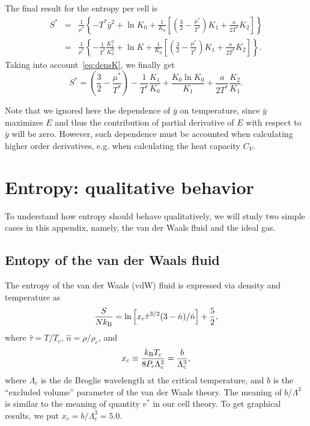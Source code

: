 \documentclass[12pt]{article}
\numberwithin{equation}{section}
\begin{document}
	The final result for the entropy per cell is
	\begin{eqnarray}
		S^{*} & = & \frac{1}{\rho^*} \left\{ -T^* \bar{y}^2 + \ln K_0 + \frac{1}{K_0} \left[\left(\frac{3}{2} - \frac{\mu^*}{T^*} \right)K_1 + \frac{a}{2 T^*} K_2\right] \right\}
		\\
		& = & \frac{1}{\rho^*} \left\{ -\frac{1}{T^*} \frac{K_1^2}{K_0^2} + \ln K + \frac{1}{K_0} \left[\left(\frac{3}{2} - \frac{\mu^*}{T^*} \right)K_1 + \frac{a}{2 T^*} K_2\right] \right\}.
	\end{eqnarray}
	Taking into account~\eqref{eq:densK}, we finally get
	\begin{equation}
		S^* = \left(\frac{3}{2} - \frac{\mu^*}{T^*}\right) - \frac{1}{T^*}\frac{K_1}{K_0} + \frac{K_0 \ln K_0}{K_1} + \frac{a}{2T^*} \frac{K_2}{K_1}.
	\end{equation}
	
	Note that we ignored here the dependence of $\bar{y}$ on temperature, since $\bar{y}$ maximizes $E$ and thus the contribution of partial derivative of $E$ with respect to $\bar{y}$ will be zero. However, such dependence must be accounted when calculating higher order derivatives, e.g. when calculating the heat capacity $C_V$.
	
	\section{Entropy: qualitative behavior}
	To understand how entropy should behave qualitatively, we will study two simple cases in this appendix, namely, the van der Waals fluid and the ideal gas.
	
	\subsection{Entopy of the van der Waals fluid}
	The entropy of the van der Waals (vdW) fluid is expressed via density and temperature as~\cite[(55)]{Johnston14}
	\begin{equation}
		\label{vdw:S}
		\frac{S}{N k_{\rm B}} = \ln \left[x_c\hat{\tau}^{3/2}(3-\hat{n})/\hat{n}\right] + \frac{5}{2},
	\end{equation}
	where $\hat{\tau} = T/T_c$, $\hat{n} = \rho/\rho_c$, and 
	\begin{equation}
		x_c \equiv \frac{k_{\rm B} T_c}{8P_c \Lambda^3_c} = \frac{b}{\Lambda^3_c},
	\end{equation}
	where $\Lambda_c$ is the de Broglie wavelength at the critical temperature, and $b$ is the ``excluded volume'' parameter of the van der Waals theory. The meaning of $b/\Lambda^3$ is similar to the meaning of quantity $v^*$ in our cell theory. To get graphical results, we put $x_c = b/\Lambda_c^3 = 5.0$.
	
\end{document}
